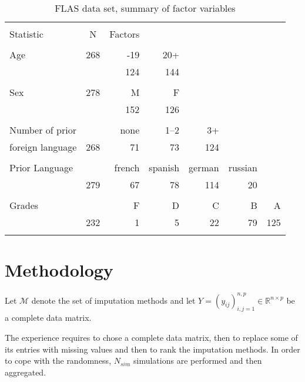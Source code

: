 \begin{table}[ht]
  \caption{FLAS data set, summary of factor variables}
  \label{tbl:flas:factor}
  \centering
\begin{tabular}{lrrrrrr}
\\[-1.8ex]\hline
\hline \\[-1.8ex]
Statistic & \multicolumn{1}{c}{N}  & Factors  &  &  &  &  \\
\hline \\[-1.8ex]
  Age  & 268 & -19 & 20+ & & \\
       & & 124 & 144  & & \\
\vspace{-5pt} \\

  Sex  & 278 & M & F & &  \\
       &     & 152 & 126 & &   \\
\vspace{-5pt} \\

  Number of prior & &  none & 1--2 & 3+ & & \\
  foreign language & 268  &  71 &  73 & 124 & &  \\
\vspace{-5pt} \\

  Prior Language & & french & spanish & german & russian & \\
       & 279 &  67 &  78 & 114 &  20 & \\
  \vspace{-5pt} \\

  Grades & & F & D & C  & B  & A \\
         & 232 & 1 & 5 & 22 & 79 & 125 \\
\hline \\[-1.8ex]
\end{tabular}
\end{table}



\section{Methodology}

Let $\mathcal{M}$ denote the set of imputation methods and let
$Y = (y_{ij})_{i,j=1}^{n,p} \in \mathbb{R}^{n\times p}$ be a complete data matrix.

The experience requires to chose a complete data matrix, then to replace some
of its entries with missing values and then to rank the imputation
methods. In order to cope with the randomness, $N_{sim}$ simulations are
performed and then aggregated.


